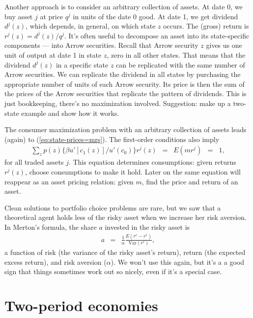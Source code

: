 \documentclass[11pt]{article}
\begin{document}
Another approach is to consider an arbitrary collection of assets.
At date 0, we buy asset $j$ at price $q^j$ in units of the date 0 good.
At date 1, we get dividend $d^j(z)$, which depends, in general,
on which state $z$ occurs.
The (gross) return is $r^j(z) = d^j(z)/q^j$.
It's often useful to decompose an asset into its state-specific components ---
into Arrow securities.
Recall that Arrow security $z$ gives us one unit of output at date 1 in state $z$,
zero in all other states.
That means that the dividend $d^j(z)$ in a specific state $z$ can be replicated with the same number
of Arrow securities.
We can replicate the dividend in all states by purchasing the appropriate number of units
of each Arrow security.
Its price is then the sum of the prices of the Arrow securities that replicate the
pattern of dividends.
This is just bookkeeping, there's no maximization involved.
Suggestion:  make up a two-state example and show how it works.


The consumer maximization problem with an arbitrary  collection of assets
leads (again) to (\ref{eq:state-prices=mrs}).
The first-order conditions also imply
\begin{eqnarray}
    \sum_z p(z) \{ \beta u'[c_1(z)]/u'(c_0) \} r^j(z) &=&
        E(m r^j) \;\;=\;\; 1 ,
        \label{eq:Emr}
\end{eqnarray}
for all traded assets $j$.
This equation determines consumptions:  given returns $r^j(z)$,
choose consumptions to make it hold.
Later on the same equation will reappear as an asset pricing relation:
given $m$, find the price and return of an asset.


Clean solutions to portfolio choice problems are rare, but we saw that a theoretical agent
holds less of the risky asset when we increase her risk aversion.
In Merton's formula, the share $a$ invested in the risky asset is
\begin{eqnarray*}
    a &=& \frac{1}{\alpha} \frac{E (r^e - r^1)}{\mbox{Var}(r^e)} ,
\end{eqnarray*}
a function of risk (the variance of the risky asset's return),
return (the expected excess return), and risk aversion ($\alpha$).
We won't use this again, but it's a a good sign that things sometimes work
out so nicely, even if it's a special case.



\section*{Two-period economies}
\end{document}
